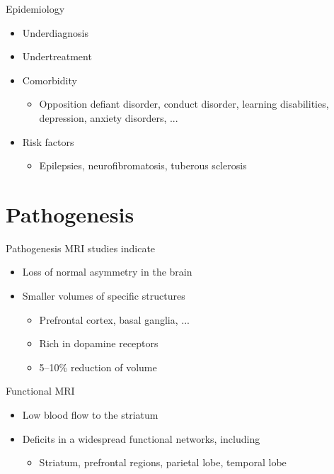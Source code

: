 \documentclass{beamer}
\begin{document}
\begin{frame}{Epidemiology}
    \begin{itemize}
        \item Underdiagnosis
        \item Undertreatment
        \item Comorbidity
        \begin{itemize}
            \item Opposition defiant disorder, conduct disorder, learning disabilities, depression, anxiety disorders, ...
        \end{itemize}

        \item Risk factors
        \begin{itemize}
            \item Epilepsies, neurofibromatosis, tuberous sclerosis
        \end{itemize}
    \end{itemize}
\end{frame}

\section{Pathogenesis}
\begin{frame}{Pathogenesis}
    MRI studies indicate

    \begin{itemize}
        \item Loss of normal asymmetry in the brain
        \item Smaller volumes of specific structures
        \begin{itemize}
            \item Prefrontal cortex, basal ganglia, ...
            \item Rich in dopamine receptors
            \item 5--10\% reduction of volume
        \end{itemize}
    \end{itemize}
\end{frame}

\begin{frame}{Functional MRI}
    \begin{itemize}
        \item Low blood flow to the striatum
        \item Deficits in a widespread functional networks, including
        \begin{itemize}
            \item Striatum, prefrontal regions, parietal lobe, temporal lobe
        \end{itemize}
    \end{itemize}
\end{frame}
\end{document}
